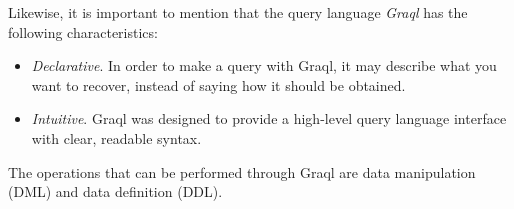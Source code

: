 Likewise, it is important to mention that the query language \textit{Graql} 
has the following characteristics:

\begin{itemize}
    \item \textit{Declarative}. In order to make a query with Graql, it may 
        describe what you want to recover, instead of saying how it should be 
        obtained.
    \item \textit{Intuitive}. Graql was designed to provide a high-level 
        query language interface with clear, readable syntax.
\end{itemize}

The operations that can be performed through Graql are data manipulation (DML) 
and data definition (DDL).

